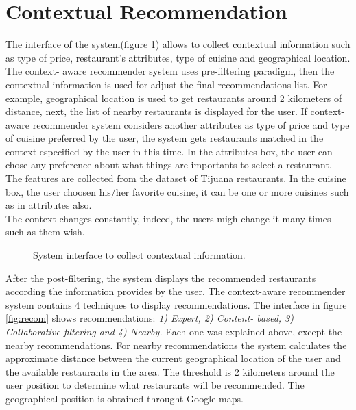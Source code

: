 \section{Contextual Recommendation} 

The interface of the system(figure \ref{fig:context})  allows to
collect contextual information such as type of price, restaurant's
attributes, type of cuisine and geographical location.  The context-
aware recommender system uses pre-filtering paradigm, then the
contextual information is used for adjust the final recommendations
list.  For example, geographical location is used to get restaurants
around  2 kilometers of distance, next, the list of nearby restaurants
is displayed  for the user. If context-aware recommender system
considers another  attributes as type of price and type of cuisine
preferred by the user, the system gets restaurants matched in the
context especified  by the user in this time.  In the attributes box,
the user can chose any preference about what things are importants to
select a restaurant. The features are collected from the dataset of
Tijuana restaurants. In the cuisine box, the user choosen his/her
favorite cuisine, it can be one or more cuisines such as in attributes also. \\  
The context changes constantly, indeed, the users migh change 
it many times such as them wish.
\begin{figure}
\captionsetup{justification=centering,margin=2cm}
\centering
{}
\caption{System interface to collect contextual information.}
\label{fig:context}   
\end{figure}
After the post-filtering, the system displays the  recommended
restaurants according the information provides by the user. The
context-aware recommender system contains 4 techniques to display
recommendations. The interface in figure \ref{fig:recom} shows
recommendations: \textit{1) Expert, 2) Content- based, 3) Collaborative
filtering and 4) Nearby.} Each one was explained above, except the
nearby recommendations. For nearby recommendations the system
calculates the approximate distance between the current geographical
location of the user and the available restaurants in the area.  The
threshold is 2 kilometers around the user position to determine what
restaurants will be recommended.  The geographical position is
obtained throught Google maps.

